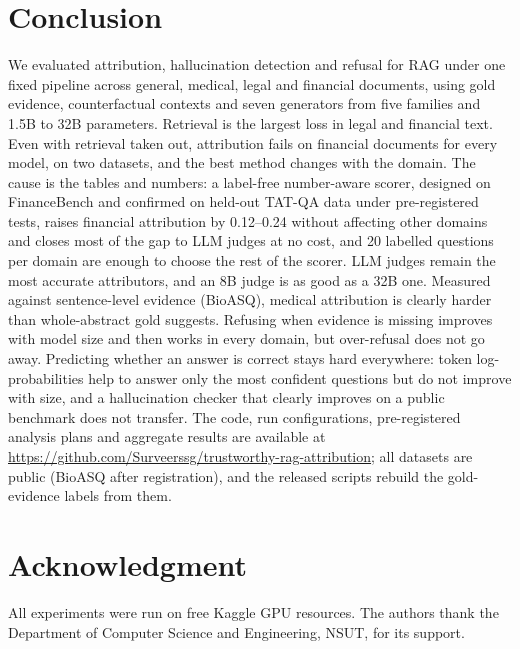 \documentclass[conference]{IEEEtran}
\begin{document}
\section{Conclusion}
We evaluated attribution, hallucination detection and refusal for RAG under one fixed pipeline across general, medical, legal and financial documents,
using gold evidence, counterfactual contexts and seven generators from five families and 1.5B to 32B parameters. Retrieval is the largest loss in
legal and financial text. Even with retrieval taken out, attribution fails on financial documents for every model, on two datasets, and the best
method changes with the domain. The cause is the tables and numbers: a label-free number-aware scorer, designed on FinanceBench and confirmed on
held-out TAT-QA data under pre-registered tests, raises financial attribution by 0.12--0.24 without affecting other domains and closes most of the
gap to LLM judges at no cost, and 20 labelled questions per domain are enough to choose the rest of the scorer. LLM judges remain the most accurate
attributors, and an 8B judge is as good as a 32B one. Measured against sentence-level evidence (BioASQ), medical attribution is clearly harder than
whole-abstract gold suggests. Refusing when evidence is missing improves with model
size and then works in every domain, but over-refusal does not go away. Predicting whether an answer is correct stays hard everywhere: token
log-probabilities help to answer only the most confident questions but do not improve with size, and a hallucination checker that clearly improves on a
public benchmark does not transfer. The code, run configurations, pre-registered analysis plans and aggregate results are available at
\url{https://github.com/Surveerssg/trustworthy-rag-attribution}; all datasets are public (BioASQ after registration), and the released scripts
rebuild the gold-evidence labels from them.

\section*{Acknowledgment}
All experiments were run on free Kaggle GPU resources. The authors thank the Department of Computer Science and Engineering, NSUT, for its support.



\end{document}
